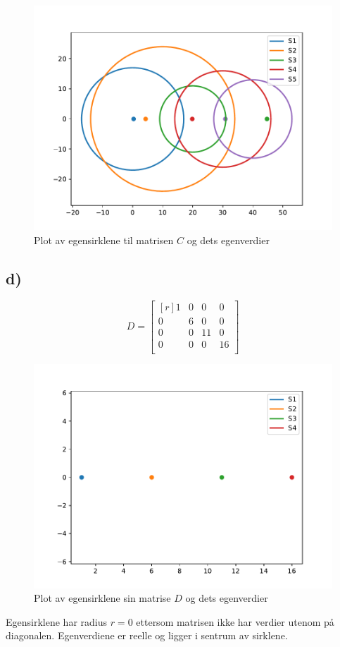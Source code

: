 \documentclass{article}
\begin{document}
      \begin{figure}[h!]
        \centering
        \includegraphics[scale = .4]{Oppgave_3C_plot.pdf}
        \caption{Plot av egensirklene til matrisen $ C $ og dets egenverdier }
        \label{fig:Matrix C}
      \end{figure}
    
    \subsection*{d)}
      \[
      D = 
      \begin{bmatrix*}[r]
       1 & 0 & 0 & 0 \\
       0 & 6 & 0 & 0 \\
       0 & 0 & 11 & 0 \\
       0 & 0 & 0 & 16 \\
      \end{bmatrix*}
      \]
    

      \begin{figure}[h!]
        \centering
        \includegraphics[scale = .4]{Oppgave_3D_plot.pdf}
        \caption{Plot av egensirklene sin matrise $ D $ og dets egenverdier}
        \label{fig:figure1}
      \end{figure}
    Egensirklene har radius $ r = 0 $ ettersom matrisen ikke har verdier utenom på diagonalen. Egenverdiene er reelle og ligger i sentrum av sirklene. 
\end{document}
